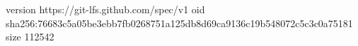 version https://git-lfs.github.com/spec/v1
oid sha256:76683c5a05be3ebb7fb0268751a125db8d69ca9136c19b548072c5c3c0a75181
size 112542
